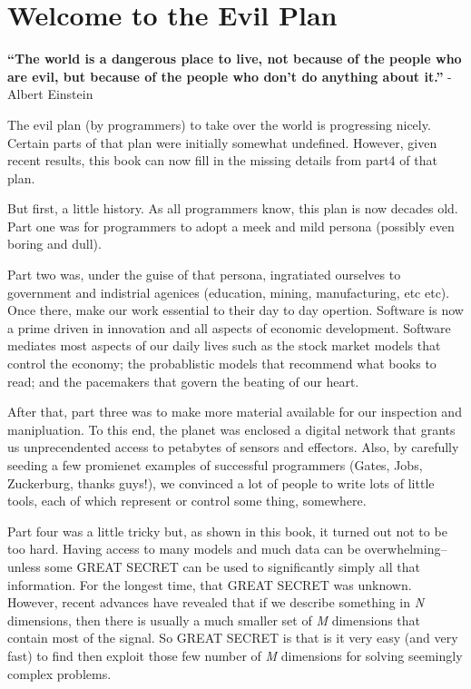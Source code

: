 \section{Welcome to the Evil Plan}\label{welcome-to-the-evil-plan}

\textbf{``The world is a dangerous place to live, not because of the
people who are evil, but because of the people who don't do anything
about it.''} - Albert Einstein

The evil plan (by programmers) to take over the world is progressing
nicely. Certain parts of that plan were initially somewhat undefined.
However, given recent results, this book can now fill in the missing
details from part4 of that plan.

But first, a little history. As all programmers know, this plan is now
decades old. Part one was for programmers to adopt a meek and mild
persona (possibly even boring and dull).

Part two was, under the guise of that persona, ingratiated ourselves to
government and indistrial agenices (education, mining, manufacturing,
etc etc). Once there, make our work essential to their day to day
opertion. Software is now a prime driven in innovation and all aspects
of economic development. Software mediates most aspects of our daily
lives such as the stock market models that control the economy; the
probablistic models that recommend what books to read; and the
pacemakers that govern the beating of our heart.

After that, part three was to make more material available for our
inspection and manipluation. To this end, the planet was enclosed a
digital network that grants us unprecendented access to petabytes of
sensors and effectors. Also, by carefully seeding a few promienet
examples of successful programmers (Gates, Jobs, Zuckerburg, thanks
guys!), we convinced a lot of people to write lots of little tools, each
of which represent or control some thing, somewhere.

Part four was a little tricky but, as shown in this book, it turned out
not to be too hard. Having access to many models and much data can be
overwhelming-- unless some GREAT SECRET can be used to significantly
simply all that information. For the longest time, that GREAT SECRET was
unknown. However, recent advances have revealed that if we describe
something in \emph{N} dimensions, then there is usually a much smaller
set of \emph{M} dimensions that contain most of the signal. So GREAT
SECRET is that is it very easy (and very fast) to find then exploit
those few number of \emph{M} dimensions for solving seemingly complex
problems.

